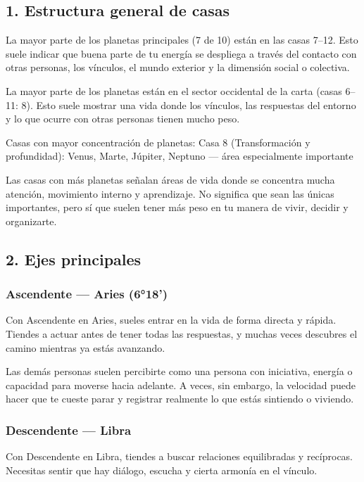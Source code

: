 \documentclass[11pt,a4paper]{article}
\begin{document}
\subsection{1. Estructura general de casas}

La mayor parte de los planetas principales (7 de 10) están en las casas 7–12. Esto suele indicar que buena parte de tu energía se despliega a través del contacto con otras personas, los vínculos, el mundo exterior y la dimensión social o colectiva.

La mayor parte de los planetas están en el sector occidental de la carta (casas 6–11: 8). Esto suele mostrar una vida donde los vínculos, las respuestas del entorno y lo que ocurre con otras personas tienen mucho peso.

Casas con mayor concentración de planetas:
Casa 8 (Transformación y profundidad): Venus, Marte, Júpiter, Neptuno — área especialmente importante

Las casas con más planetas señalan áreas de vida donde se concentra mucha atención, movimiento interno y aprendizaje. No significa que sean las únicas importantes, pero sí que suelen tener más peso en tu manera de vivir, decidir y organizarte.

\vspace{0.5cm}

\subsection{2. Ejes principales}

\subsubsection*{Ascendente — Aries (6°18')}
Con Ascendente en Aries, sueles entrar en la vida de forma directa y rápida. Tiendes a actuar antes de tener todas las respuestas, y muchas veces descubres el camino mientras ya estás avanzando.

Las demás personas suelen percibirte como una persona con iniciativa, energía o capacidad para moverse hacia adelante. A veces, sin embargo, la velocidad puede hacer que te cueste parar y registrar realmente lo que estás sintiendo o viviendo.

\subsubsection*{Descendente — Libra}
Con Descendente en Libra, tiendes a buscar relaciones equilibradas y recíprocas. Necesitas sentir que hay diálogo, escucha y cierta armonía en el vínculo.
\end{document}
